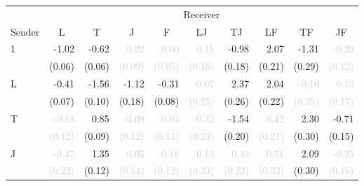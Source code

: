 \begin{tabular}{lrrrrrrrrr}
\toprule
& \multicolumn{9}{c}{Receiver} \\
\cmidrule(l){2-10} 
Sender & \multicolumn{1}{c}{L} & \multicolumn{1}{c}{T} & \multicolumn{1}{c}{J} & \multicolumn{1}{c}{F} & \multicolumn{1}{c}{LJ} & \multicolumn{1}{c}{TJ} & \multicolumn{1}{c}{LF} & \multicolumn{1}{c}{TF} & \multicolumn{1}{c}{JF} \\
\midrule
\multirow{2}{*}{1} &-1.02 &-0.62 &\textcolor{LightGray}{0.22} &\textcolor{LightGray}{0.00} &\textcolor{LightGray}{0.15} &-0.98 &2.07 &-1.31 &\textcolor{LightGray}{-0.20}\\
 &\tiny{(0.06)} &\tiny{(0.06)} &\textcolor{LightGray}{\tiny{(0.09)}} &\textcolor{LightGray}{\tiny{(0.05)}} &\textcolor{LightGray}{\tiny{(0.18)}} &\tiny{(0.18)} &\tiny{(0.21)} &\tiny{(0.29)} &\textcolor{LightGray}{\tiny{(0.12)}}\\[1ex]
\multirow{2}{*}{L} &\cellcolor{Gray}-0.41 &-1.56 &-1.12 &-0.31 &\textcolor{LightGray}{-0.07} &2.37 &2.04 &\textcolor{LightGray}{-0.10} &\textcolor{LightGray}{0.13}\\
 &\cellcolor{Gray}\tiny{(0.07)} &\tiny{(0.10)} &\tiny{(0.18)} &\tiny{(0.08)} &\textcolor{LightGray}{\tiny{(0.25)}} &\tiny{(0.26)} &\tiny{(0.22)} &\textcolor{LightGray}{\tiny{(0.35)}} &\textcolor{LightGray}{\tiny{(0.17)}}\\[1ex]
\multirow{2}{*}{T} &\textcolor{LightGray}{-0.13} &\cellcolor{Gray}0.85 &\textcolor{LightGray}{-0.09} &\textcolor{LightGray}{-0.04} &\textcolor{LightGray}{-0.32} &-1.54 &\textcolor{LightGray}{0.42} &2.30 &-0.71\\
 &\textcolor{LightGray}{\tiny{(0.12)}} &\cellcolor{Gray}\tiny{(0.09)} &\textcolor{LightGray}{\tiny{(0.12)}} &\textcolor{LightGray}{\tiny{(0.11)}} &\textcolor{LightGray}{\tiny{(0.23)}} &\tiny{(0.20)} &\textcolor{LightGray}{\tiny{(0.27)}} &\tiny{(0.30)} &\tiny{(0.15)}\\[1ex]
\multirow{2}{*}{J} &\textcolor{LightGray}{-0.47} &1.35 &\cellcolor{Gray}\textcolor{LightGray}{0.05} &\textcolor{LightGray}{-0.18} &\textcolor{LightGray}{0.13} &\textcolor{LightGray}{0.40} &\textcolor{LightGray}{0.71} &2.09 &\textcolor{LightGray}{-0.25}\\
 &\textcolor{LightGray}{\tiny{(0.22)}} &\tiny{(0.12)} &\cellcolor{Gray}\textcolor{LightGray}{\tiny{(0.14)}} &\textcolor{LightGray}{\tiny{(0.12)}} &\textcolor{LightGray}{\tiny{(0.33)}} &\textcolor{LightGray}{\tiny{(0.22)}} &\textcolor{LightGray}{\tiny{(0.33)}} &\tiny{(0.30)} &\textcolor{LightGray}{\tiny{(0.16)}}\\[1ex]

\end{tabular}
